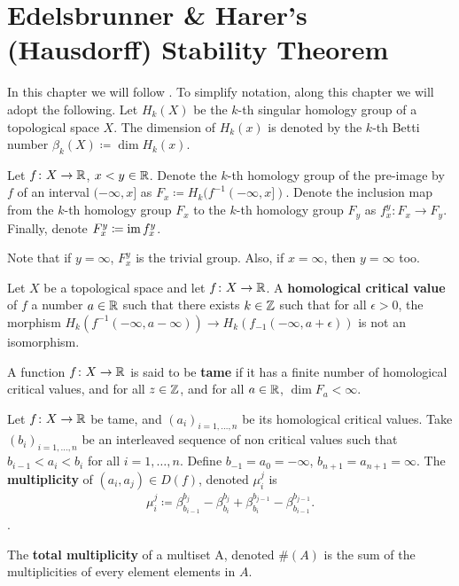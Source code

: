 \chapter{Edelsbrunner \& Harer's (Hausdorff) Stability Theorem}

In this chapter we will follow \cite{Edelsbrunner}. To simplify notation, along this chapter we will adopt the following. Let $ H_k(X) $ be the $k$-th singular homology group of a topological space $ X $. The dimension of $ H_k(x) $ is denoted by the $k$-th Betti number $ \beta_k(X) \coloneq \dim H_k(x) $.

Let $ f\colon X \to \mathbb R $, $x < y \in \mathbb R$. Denote the $k$-th homology group of the pre-image by $ f $ of an interval $ (-\infty, x] $ as $ F_x \coloneq H_k(f^{-1}(-\infty, x])$. Denote the inclusion map from the $k$-th homology group $ F_x$ to the  $k$-th homology group $ F_y$ as $f_x^y \colon F_x \to F_y $. Finally, denote $ F_x^y \coloneq \operatorname{im} f_x^y $.

Note that if $ y = \infty $, $ F_x^y $ is the trivial group. Also, if $ x = \infty $, then $ y = \infty $ too. 


\begin{definition}
    Let $ X $ be a topological space and let $ f\colon X \to \mathbb R $. A {\bf homological critical value} of $ f $ a number $ a \in \mathbb R $ such that there exists $k \in \mathbb Z$ such that for all 
    $ \epsilon > 0 $, the morphism $ H_k(f^{-1}(-\infty, a - \infty)) \to H_k(f_{-1}(-\infty, a + \epsilon)) $ is not an isomorphism.
\end{definition}

\begin{definition}
    A function $ f\colon X \to \mathbb R $ is said to be {\bf tame} if it has a finite number of homological critical values, and for all $ z \in \mathbb Z $, and for all $ a \in \mathbb R $, $ \dim F_a < \infty $.
\end{definition}

\begin{definition}[Multiplicity]
    Let $f \colon X \to \mathbb R $ be tame, and $ (a_i)_{i = 1, \dots, n} $ be its homological critical values. Take $ (b_i)_{i = 1, \dots, n} $ be an interleaved sequence of non critical values such that $ b_{i-1} < a_i < b_i $ for all $ i = 1, \dots, n $. Define $ b_{-1} = a_0 = -\infty $, $b_{n+1} = a_{n+1} = \infty $. The {\bf multiplicity} of $ (a_i, a_j) \in D(f) $, denoted $ \mu_i^j $ is
    \begin{align}
        \mu_i^j \coloneq \beta_{b_{i-1}}^{b_j} - \beta_{b_{i}}^{b_j} + \beta_{b_{i}}^{b_{j-1}} - \beta_{b_{i-1}}^{b_{j-1}}.
    \end{align}.

    The {\bf total multiplicity} of a multiset A, denoted $ \#(A) $ is the sum of the multiplicities of every element elements in $A$.
\end{definition}

